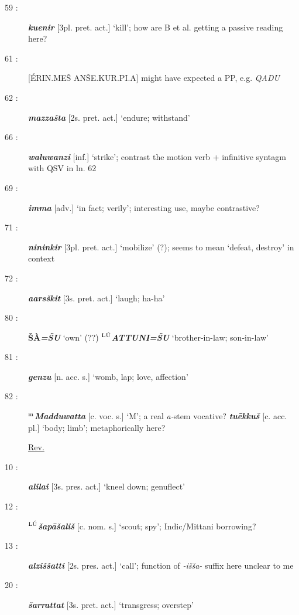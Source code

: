 \documentclass[10pt]{article}
\newcommand{\supersc}[1]{$^{\textrm{\scriptsize{#1}}}$}  	%
\newcommand{\bit}[1]{\textbf{\textit{#1}}}				%
\newcommand{\p}[1]{{\tiny[{#1}]}}					%
\newcommand{\hith}{\textsubwedge{h}}
\newcommand{\Hith}{\textsubwedge{H}}
\newcommand{\man}{\supersc{L\'U}}
\renewcommand{\.}[1]{\textsubdot{#1}}
\begin{document}
\begin{description}
\item[59 :] \bit{kuenir} \p{3pl. pret. act.} `kill'; how are B et al. getting a passive reading here?

\item[61 :] [\'ERIN.ME\v{S} AN\v{S}E.KUR.P{\Hith}I.A] might have expected a PP, e.g. \textit{QADU}

\item[62 :] \bit{mazza\v{s}ta} \p{2s. pret. act.} `endure; withstand'

\item[66 :] \bit{wal{\hith}uwanzi} \p{inf.} `strike'; contrast the motion verb + infinitive syntagm with QSV in ln. 62 

\item[69 :] \bit{imma} \p{adv.} `in fact; verily'; interesting use, maybe contrastive?

\item[71 :] \bit{nininkir} \p{3pl. pret. act.} `mobilize' (?); seems to mean `defeat, destroy' in context

\item[72 :] \bit{{\hith}a{\hith\hith}ars\v{s}kit} \p{3s. pret. act.} `laugh; ha-ha'

\item[80 :] \textbf{\v{S}\`A}\bit{=\v{S}U} `own' (??) \textbf{\man}\bit{{\Hith}ATTUNI=\v{S}U} `brother-in-law; son-in-law'

\item[81 :] \bit{genzu} \p{n. acc. s.} `womb, lap; love, affection'

\item[82 :] \textbf{\supersc{m}}\bit{Madduwatta} \p{c. voc. s.} `M'; a real \textit{a-}stem vocative? \bit{tu\=ekku\v{s}} \p{c. acc. pl.} `body; limb'; metaphorically here?

\bigskip
\underline{Rev.}
\bigskip

\item[10 :] \bit{{\hith}ali{\hith}lai} \p{3s. pres. act.} `kneel down; genuflect'

\item[12 :] \textbf{\man}\bit{\v{s}ap\=a\v{s}ali\v{s}} \p{c. nom. s.} `scout; spy'; Indic/Mittani borrowing?

\item[13 :] \bit{{\hith}alzi\v{s}\v{s}atti} \p{2s. pres. act.} `call'; function of \textit{-i\v{s}\v{s}a-} suffix here unclear to me

\item[20 :] \bit{\v{s}arrattat} \p{3s. pret. act.} `transgress; overstep'


\end{description}
\end{document}

